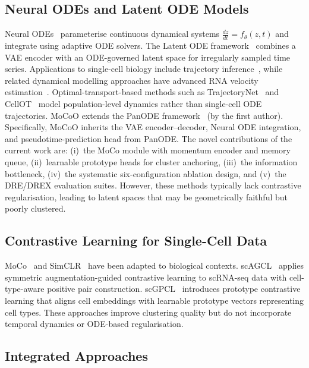 \documentclass[journal]{IEEEtran}
\begin{document}
\subsection{Neural ODEs and Latent ODE Models}
\label{sec:related:ode}

Neural ODEs~\cite{chen2018neural} parameterise continuous dynamical systems $\frac{dz}{dt} = f_\theta(z, t)$ and integrate using adaptive ODE solvers. The Latent ODE framework~\cite{rubanova2019latent} combines a VAE encoder with an ODE-governed latent space for irregularly sampled time series. Applications to single-cell biology include trajectory inference~\cite{fu2025panode}, while related dynamical modelling approaches have advanced RNA velocity estimation~\cite{bergen2020generalizing}. Optimal-transport-based methods such as TrajectoryNet~\cite{tong2020trajectorynet} and CellOT~\cite{bunne2023cellot} model population-level dynamics rather than single-cell ODE trajectories. MoCoO extends the PanODE framework~\cite{fu2025panode} (by the first author). Specifically, MoCoO inherits the VAE encoder--decoder, Neural ODE integration, and pseudotime-prediction head from PanODE. The novel contributions of the current work are: (i)~the MoCo module with momentum encoder and memory queue, (ii)~learnable prototype heads for cluster anchoring, (iii)~the information bottleneck, (iv)~the systematic six-configuration ablation design, and (v)~the DRE/DREX evaluation suites. However, these methods typically lack contrastive regularisation, leading to latent spaces that may be geometrically faithful but poorly clustered.

\subsection{Contrastive Learning for Single-Cell Data}
\label{sec:related:contrastive}

MoCo~\cite{he2020momentum} and SimCLR~\cite{chen2020simple} have been adapted to biological contexts. scAGCL~\cite{cai2024scagcl} applies symmetric augmentation-guided contrastive learning to scRNA-seq data with cell-type-aware positive pair construction. scGPCL~\cite{cai2024scgpcl} introduces prototype contrastive learning that aligns cell embeddings with learnable prototype vectors representing cell types. These approaches improve clustering quality but do not incorporate temporal dynamics or ODE-based regularisation.

\subsection{Integrated Approaches}
\label{sec:related:integrated}
\end{document}
